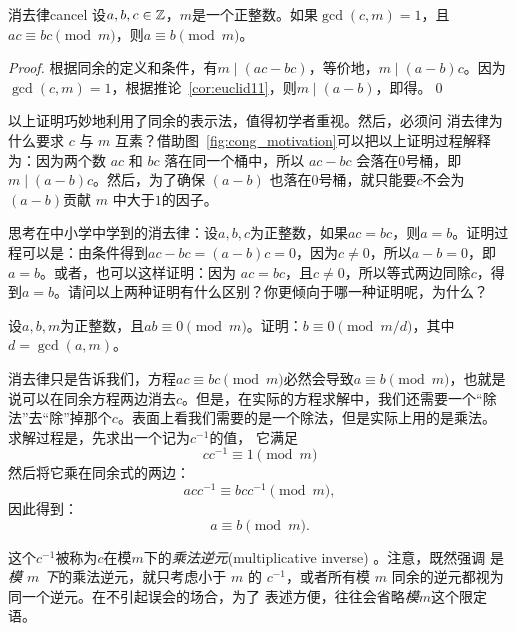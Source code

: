 \begin{proposition}{消去律}{cancel}
设$a, b, c \in {\mathbb Z}$，$m$是一个正整数。如果$\gcd(c, m) = 1$，且$ac \equiv bc \pmod{m}$，则$a \equiv b \pmod{m}$。
\end{proposition}

\begin{proof} 
	根据同余的定义和条件，有$m \mid (ac - bc)$，等价地，$m \mid (a - b)c$。因为$\gcd(c,m) = 1$，根据推论~\ref{cor:euclid11}，则$m \mid (a - b)$，即得。\qed
\end{proof}
以上证明巧妙地利用了同余的表示法，值得初学者重视。然后，必须问
消去律为什么要求 $c$ 与 $m$ 互素？借助图~\ref{fig:cong_motivation}可以把以上证明过程解释为：因为两个数 $ac$ 和 $bc$ 落在同一个桶中，所以 $ac - bc$ 会落在$0$号桶，即$m \mid (a - b)c$。然后，为了确保 $(a - b)$ 也落在$0$号桶，就只能要$c$不会为 $(a - b)$贡献 $m$ 中大于$1$的因子。

\begin{thinking}
	思考在中小学中学到的消去律：设$a, b, c$为正整数，如果$ac = bc$，则$a = b$。证明过程可以是：由条件得到$ac - bc = (a - b)c = 0$，因为$c\neq 0$，所以$a-b = 0$，即$a = b$。或者，也可以这样证明：因为 $ac = bc$，且$c \neq 0$，所以等式两边同除$c$，得到$a = b$。请问以上两种证明有什么区别？你更倾向于哪一种证明呢，为什么？
\end{thinking}

\begin{thinking}
\label{thk:ab_mod_m}
	设$a, b, m$为正整数，且$a b \equiv 0 \pmod{m}$。证明：$b \equiv 0 \pmod{m/d}$，其中$d =\gcd(a, m)$。
\end{thinking}

消去律只是告诉我们，方程$ac \equiv bc \pmod{m}$必然会导致$a \equiv b \pmod{m}$，也就是说可以在同余方程两边消去$c$。但是，在实际的方程求解中，我们还需要一个“除法”去“除”掉那个$c$。表面上看我们需要的是一个除法，但是实际上用的是乘法。
求解过程是，先求出一个记为$c^{-1}$的值，
它满足\[cc^{-1} \equiv 1 \pmod{m}\] 
然后将它乘在同余式的两边：
\[acc^{-1} \equiv bcc^{-1}\pmod{m},\]
\noindent 因此得到：
\[a \equiv b \pmod{m}.\]
	
这个$c^{-1}$被称为$c$在模$m$下的\emph{乘法逆元}(multiplicative inverse) 。注意，既然强调
是\emph{模 $m$ 下}的乘法逆元，就只考虑小于 $m$ 的 $c^{-1}$，或者所有模 $m$ 同余的逆元都视为同一个逆元。在不引起误会的场合，为了
表述方便，往往会省略\emph{模$m$}这个限定语。

